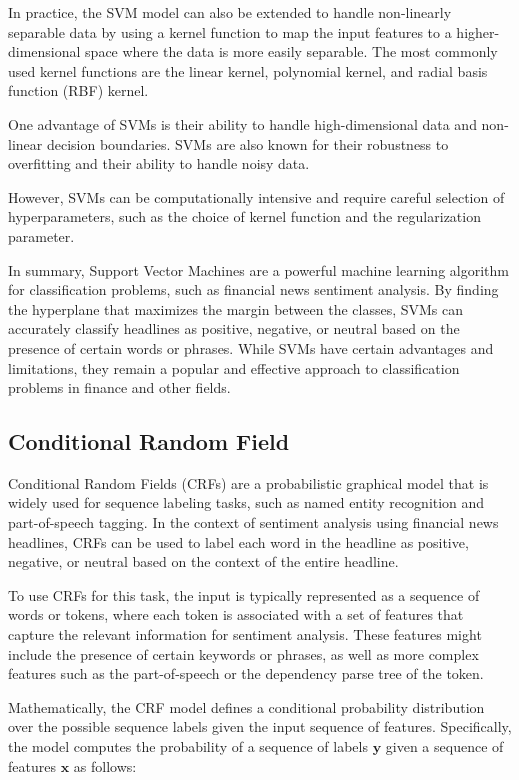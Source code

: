 \documentclass{article}
\begin{document}
In practice, the SVM model can also be extended to handle non-linearly separable data by using a kernel function to map the input features to a higher-dimensional space where the data is more easily separable. The most commonly used kernel functions are the linear kernel, polynomial kernel, and radial basis function (RBF) kernel.

One advantage of SVMs is their ability to handle high-dimensional data and non-linear decision boundaries. SVMs are also known for their robustness to overfitting and their ability to handle noisy data.

However, SVMs can be computationally intensive and require careful selection of hyperparameters, such as the choice of kernel function and the regularization parameter.

In summary, Support Vector Machines are a powerful machine learning algorithm for classification problems, such as financial news sentiment analysis. By finding the hyperplane that maximizes the margin between the classes, SVMs can accurately classify headlines as positive, negative, or neutral based on the presence of certain words or phrases. While SVMs have certain advantages and limitations, they remain a popular and effective approach to classification problems in finance and other fields.

\subsection{Conditional Random Field}

Conditional Random Fields (CRFs) are a probabilistic graphical model that is widely used for sequence labeling tasks, such as named entity recognition and part-of-speech tagging. In the context of sentiment analysis using financial news headlines, CRFs can be used to label each word in the headline as positive, negative, or neutral based on the context of the entire headline.

To use CRFs for this task, the input is typically represented as a sequence of words or tokens, where each token is associated with a set of features that capture the relevant information for sentiment analysis. These features might include the presence of certain keywords or phrases, as well as more complex features such as the part-of-speech or the dependency parse tree of the token.

Mathematically, the CRF model defines a conditional probability distribution over the possible sequence labels given the input sequence of features. Specifically, the model computes the probability of a sequence of labels $\mathbf{y}$ given a sequence of features $\mathbf{x}$ as follows:
\end{document}
